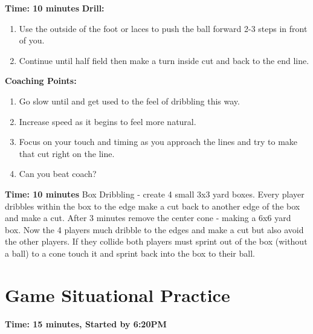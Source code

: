 \documentclass[10pt,letterpaper]{article}
\newenvironment{evenBlock}[1]{%
    \tcolorbox[beamer,%
    noparskip,breakable,
    colback=LightGreen,colframe=DarkGreen,%
    colbacklower=LimeGreen!75!LightGreen,%
    title=#1]}%
    {\endtcolorbox}
\newenvironment{oddBlock}[1]{%
    \tcolorbox[beamer,%
    noparskip,breakable,
    colback=LightBlue,colframe=DarkBlue,%
    colbacklower=DarkBlue!75!LightBlue,%
    title=#1]}%
    {\endtcolorbox}
\begin{document}
\textbf{Time: 10 minutes}
\begin{oddBlock}{Straight line dribbling at speed ( 10 min )}
    \textbf{Drill:}
    \begin{enumerate}
        \setlength{\itemsep}{0pt}
        \setlength{\parskip}{0pt}
        \setlength{\parsep}{0pt}
        \item Use the outside of the foot or laces to push the ball forward 2-3 steps in front of you.
        \item Continue until half field then make a turn inside cut and back to the end line.
    \end{enumerate}
    \textbf{Coaching Points:}
    \begin{enumerate}
        \setlength{\itemsep}{0pt}
        \setlength{\parskip}{0pt}
        \setlength{\parsep}{0pt}
        \item Go slow until and get used to the feel of dribbling this way.
        \item Increase speed as it begins to feel more natural.
        \item Focus on your touch and timing as you approach the lines and try to make that cut right on the line.
        \item Can you beat coach?
    \end{enumerate}
\end{oddBlock}

\textbf{Time: 10 minutes}
%
\begin{evenBlock}{Box Dribbling}
Box Dribbling - create 4 small 3x3 yard boxes.  Every player dribbles within the box to the edge make a cut back to another edge of the box and make a cut.  After 3 minutes remove the center cone - making a 6x6 yard box.  Now the 4 players much dribble to the edges and make a cut but also avoid the other players.  If they collide both players must sprint out of the box (without a ball) to a cone touch it and sprint back into the box to their ball.
\end{evenBlock}

\section{Game Situational Practice}
\textbf{Time: 15 minutes, Started by 6:20PM}


%

%
\end{document}
